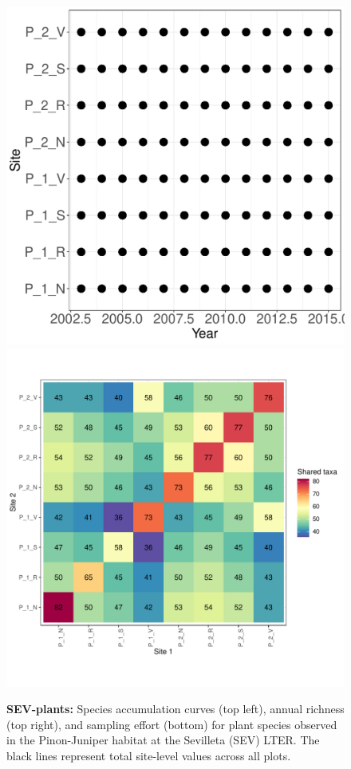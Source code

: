 \documentclass[11pt, oneside]{article}
\begin{document}
\begin{figure}[h!]
\includegraphics[scale = 0.4]{sev-plants-compagnoni_spatiotemporal_sampling_effort.pdf}
\includegraphics[scale = 0.4]{sev-plants-compagnoni_spp_shared.pdf}
\caption{{\bf SEV-plants:} Species accumulation curves (top left),  annual richness (top right), and sampling effort (bottom)  for plant species observed in the Pinon-Juniper habitat at the Sevilleta  (SEV) LTER. The black lines represent total site-level values across all plots.}
\label{sev-plants}
\end{figure}
\end{document}
